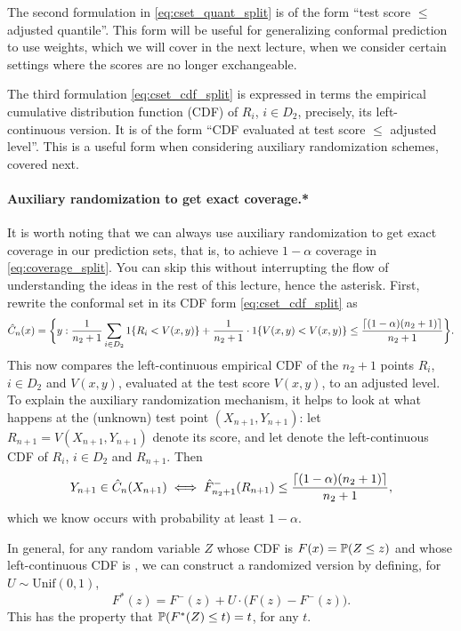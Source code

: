 \documentclass{article}
\begin{document}
The second formulation in \eqref{eq:cset_quant_split} is of the form ``test
score $\leq$ adjusted quantile''. This form will be useful for generalizing
conformal prediction to use weights, which we will cover in the next lecture,
when we consider certain settings where the scores are no longer exchangeable. 

The third formulation \eqref{eq:cset_cdf_split} is expressed in terms the
empirical cumulative distribution function (CDF) of $R_i$, $i \in D_2$,
precisely, its left-continuous version. It is of the form ``CDF evaluated at
test score $\leq$ adjusted level''. This is a useful form when considering
auxiliary randomization schemes, covered next.      

\paragraph{Auxiliary randomization to get exact coverage.*}  

It is worth noting that we can always use auxiliary randomization to get exact
coverage in our prediction sets, that is, to achieve $1-\alpha$ coverage in
\eqref{eq:coverage_split}. You can skip this without interrupting the flow of
understanding the ideas in the rest of this lecture, hence the asterisk. First,
rewrite the conformal set in its CDF form \eqref{eq:cset_cdf_split} as   
\[
\hC_n(x) = \bigg\{ y : \frac{1}{n_2+1} \sum_{i \in D_2} 1\{ R_i < V(x,y) \}
+ \frac{1}{n_2+1} \cdot 1\{ V(x,y) < V(x,y) \} \leq \frac{\lceil
  (1-\alpha)(n_2+1) \rceil}{n_2+1} \bigg\}.     
\]
This now compares the left-continuous empirical CDF of the $n_2+1$ points
$R_i$, $i \in D_2$ and $V(x,y)$, evaluated at the test score $V(x,y)$, to an
adjusted level. To explain the auxiliary randomization mechanism, it helps to
look at what happens at the (unknown) test point  $(X_{n+1},Y_{n+1})$: let
$R_{n+1} = V(X_{n+1},Y_{n+1})$ denote its score, and let
 denote the left-continuous CDF of $R_i$, $i \in D_2$ 
and $R_{n+1}$. Then     
\[
Y_{n+1} \in \hC_n(X_{n+1}) \iff \hat{F}^-_{n_2+1}(R_{n+1}) \leq \frac{\lceil  
  (1-\alpha)(n_2+1) \rceil}{n_2+1}, 
\]
which we know occurs with probability at least $1-\alpha$. 

In general, for any random variable $Z$ whose CDF is $F(x) = \P(Z \leq z)$ and
whose left-continuous CDF is , we can construct a randomized version by defining, for $U \sim
\mathrm{Unif}(0,1)$,  
\[
F^*(z) = F^-(z) + U \cdot \big( F(z) - F^-(z) \big).
\]
This has the property that $\P(F^*(Z) \leq t) = t$, for any $t$.
\end{document}
